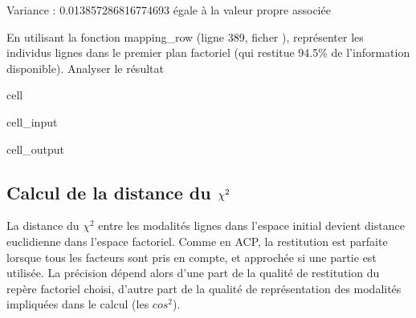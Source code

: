 \documentclass[letterpaper,10pt,french]{sphinxmanual}
\begin{document}
\sphinxAtStartPar
Variance :  0.013857286816774693 égale à la valeur propre associée

\sphinxAtStartPar
En utilisant la fonction mapping\_row (ligne 389, ficher ), représenter les individus lignes dans le premier plan factoriel (qui restitue 94.5\% de l’information disponible). Analyser le résultat

\begin{sphinxuseclass}{cell}
\begin{sphinxuseclass}{cell_input}
\begin{sphinxVerbatim}[commandchars=\\\{\}]
\end{sphinxVerbatim}

\end{sphinxuseclass}
\begin{sphinxuseclass}{cell_output}
\noindent{}

\end{sphinxuseclass}
\end{sphinxuseclass}

\subsection{Calcul de la distance du \protect\(\chi^2\protect\)}
\label{\detokenize{TP3_AFC_ACM:calcul-de-la-distance-du-chi-2}}
\sphinxAtStartPar
La distance du \(\chi^2\) entre les modalités lignes dans l’espace initial devient distance euclidienne dans l’espace factoriel. Comme en ACP, la restitution est parfaite lorsque tous les facteurs sont pris en compte, et approchée si une partie est utilisée. La précision dépend alors d’une part de la qualité de restitution du repère factoriel choisi, d’autre part de la qualité de représentation des modalités impliquées dans le calcul (les \(cos^2\)).
\end{document}
